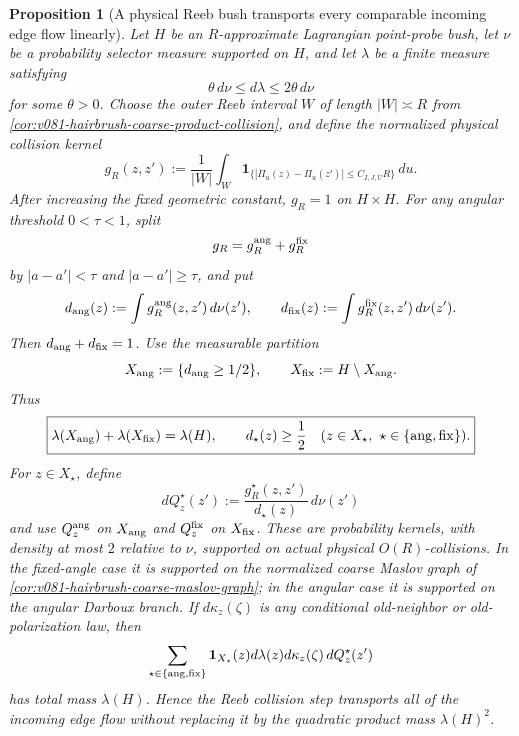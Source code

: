 \documentclass[10pt]{article}
\newtheorem{proposition}[theorem]{Proposition}
\begin{document}
\begin{proposition}[A physical Reeb bush transports every comparable incoming edge flow linearly]
\label{prop:v081-one-bush-linear-edge-flow-transfer}
Let \(H\) be an \(R\)-approximate Lagrangian point-probe bush, let \(\nu\) be a probability
selector measure supported on \(H\), and let \(\lambda\) be a finite measure satisfying
\begin{equation}
\label{eq:v081-comparable-bush-edge-flow}
\theta\,d\nu
\le d\lambda
\le2\theta\,d\nu
\end{equation}
for some \(\theta>0\).  Choose the outer Reeb interval \(W\) of length
\(|W|\asymp R\) from
\cref{cor:v081-hairbrush-coarse-product-collision}, and define the normalized physical collision
kernel
\[
g_R(z,z')
:=
\frac1{|W|}\int_W
\mathbf1_{\{|\Pi_u(z)-\Pi_u(z')|\le C_{I,J,U}R\}}\,du.
\]
After increasing the fixed geometric constant, \(g_R=1\) on \(H\times H\).  For any angular
threshold \(0<\tau<1\), split
\[
g_R=g_R^{\rm ang}+g_R^{\rm fix}
\]
by \(|a-a'|<\tau\) and \(|a-a'|\ge\tau\), and put
\[
d_{\rm ang}(z):=\int g_R^{\rm ang}(z,z')\,d\nu(z'),
\qquad
d_{\rm fix}(z):=\int g_R^{\rm fix}(z,z')\,d\nu(z').
\]
Then \(d_{\rm ang}+d_{\rm fix}=1\).  Use the measurable partition
\[
X_{\rm ang}:=\{d_{\rm ang}\ge1/2\},
\qquad
X_{\rm fix}:=H\setminus X_{\rm ang}.
\]
Thus
\begin{equation}
\label{eq:v081-one-bush-linear-edge-retention}
\boxed{
\lambda(X_{\rm ang})+\lambda(X_{\rm fix})=\lambda(H),
\qquad
d_\star(z)\ge\frac12
\quad(z\in X_\star,\ \star\in\{{\rm ang},{\rm fix}\}).
}
\end{equation}
For \(z\in X_\star\), define
\begin{equation}
\label{eq:v081-one-bush-reeb-markov-kernel}
dQ_z^\star(z')
:=
\frac{g_R^\star(z,z')}{d_\star(z)}\,d\nu(z')
\end{equation}
and use \(Q_z^{\rm ang}\) on \(X_{\rm ang}\) and \(Q_z^{\rm fix}\) on
\(X_{\rm fix}\).  These are probability kernels, with density at most \(2\) relative to \(\nu\),
supported on actual physical \(O(R)\)-collisions.  In the fixed-angle case it is supported on the normalized coarse
Maslov graph of
\cref{cor:v081-hairbrush-coarse-maslov-graph}; in the angular case it is supported on the angular
Darboux branch.  If \(d\kappa_z(\zeta)\) is any conditional old-neighbor or old-polarization law,
then
\[
\sum_{\star\in\{{\rm ang},{\rm fix}\}}
\mathbf1_{X_\star}(z)
d\lambda(z)d\kappa_z(\zeta)\,dQ_z^\star(z')
\]
has total mass \(\lambda(H)\).  Hence the Reeb collision step transports all of
the incoming edge flow without replacing it by the quadratic product mass \(\lambda(H)^2\).


\end{proposition}
\end{document}
